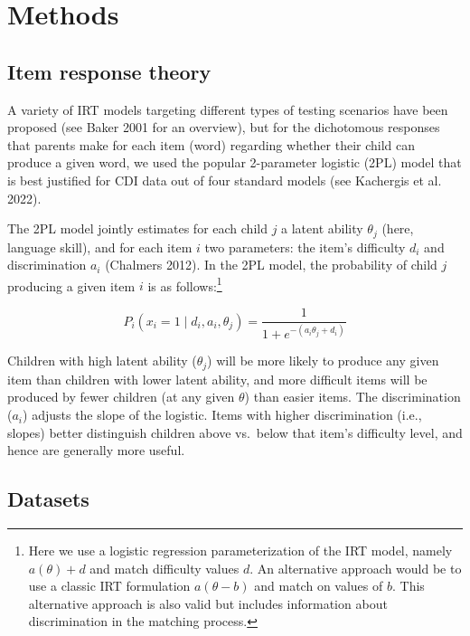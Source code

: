 \documentclass[
  letterpaper,
  DIV=11,
  numbers=noendperiod]{scrartcl}
\begin{document}
\section{Methods}\label{methods}

\subsection{Item response theory}\label{item-response-theory}

A variety of IRT models targeting different types of testing scenarios
have been proposed (see Baker 2001 for an overview), but for the
dichotomous responses that parents make for each item (word) regarding
whether their child can produce a given word, we used the popular
2-parameter logistic (2PL) model that is best justified for CDI data out
of four standard models (see Kachergis et al. 2022).

The 2PL model jointly estimates for each child \(j\) a latent ability
\(\theta_j\) (here, language skill), and for each item \(i\) two
parameters: the item's difficulty \(d_i\) and discrimination \(a_i\)
(Chalmers 2012). In the 2PL model, the probability of child \(j\)
producing a given item \(i\) is as follows:\footnote{Here we use a
  logistic regression parameterization of the IRT model, namely
  \(a(\theta) + d\) and match difficulty values \(d\). An alternative
  approach would be to use a classic IRT formulation \(a(\theta - b)\)
  and match on values of \(b\). This alternative approach is also valid
  but includes information about discrimination in the matching process.}

\[P_{i}(x_i = 1 \mid d_{i},a_{i},\theta_j ) = \frac{1}{1 + e^{- (a_{i}\theta_j + d_i)}}\]

Children with high latent ability (\(\theta_j\)) will be more likely to
produce any given item than children with lower latent ability, and more
difficult items will be produced by fewer children (at any given
\(\theta\)) than easier items. The discrimination (\(a_i\)) adjusts the
slope of the logistic. Items with higher discrimination (i.e., slopes)
better distinguish children above vs.~below that item's difficulty
level, and hence are generally more useful.

\subsection{Datasets}\label{datasets}
\end{document}
